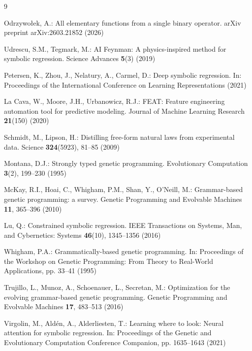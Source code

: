 \documentclass[runningheads]{llncs}
\begin{document}
\begin{sloppypar}
\begin{thebibliography}{9}

Odrzywo\l{}ek, A.: All elementary functions from a single binary operator. arXiv preprint arXiv:2603.21852 (2026)

Udrescu, S.M., Tegmark, M.: AI Feynman: A physics-inspired method for symbolic regression. Science Advances \textbf{5}(3) (2019)

Petersen, K., Zhou, J., Nelatury, A., Carmel, D.: Deep symbolic regression. In: Proceedings of the International Conference on Learning Representations (2021)

La Cava, W., Moore, J.H., Urbanowicz, R.J.: FEAT: Feature engineering automation tool for predictive modeling. Journal of Machine Learning Research \textbf{21}(150) (2020)

Schmidt, M., Lipson, H.: Distilling free-form natural laws from experimental data. Science \textbf{324}(5923), 81--85 (2009)

Montana, D.J.: Strongly typed genetic programming. Evolutionary Computation \textbf{3}(2), 199--230 (1995)

McKay, R.I., Hoai, C., Whigham, P.M., Shan, Y., O'Neill, M.: Grammar-based genetic programming: a survey. Genetic Programming and Evolvable Machines \textbf{11}, 365--396 (2010)

Lu, Q.: Constrained symbolic regression. IEEE Transactions on Systems, Man, and Cybernetics: Systems \textbf{46}(10), 1345--1356 (2016)

Whigham, P.A.: Grammatically-based genetic programming. In: Proceedings of the Workshop on Genetic Programming: From Theory to Real-World Applications, pp. 33--41 (1995)

Trujillo, L., Munoz, A., Schoenauer, L., Secretan, M.: Optimization for the evolving grammar-based genetic programming. Genetic Programming and Evolvable Machines \textbf{17}, 483--513 (2016)

Virgolin, M., Ald\'en, A., Alderliesten, T.: Learning where to look: Neural attention for symbolic regression. In: Proceedings of the Genetic and Evolutionary Computation Conference Companion, pp. 1635--1643 (2021)

\end{thebibliography}
\end{sloppypar}
\end{document}
